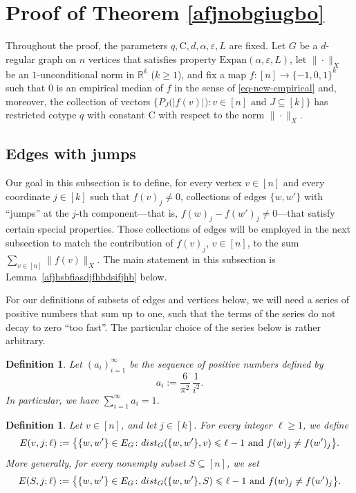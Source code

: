 \documentclass[11pt,leqno]{amsart}
\newtheorem{definition}[theorem]{Definition}
\theoremstyle{remark}
\theoremstyle{plain}
\newcommand{\R}{\mathbb{R}}
\def\dist{{\rm dist}}
\def\dist{{\rm dist}}
\begin{document}
\section{Proof of Theorem \ref*{afjnobgiugbo}} \label{sec4}

Throughout the proof, the parameters $q, \mathrm{C}, d, \alpha,\varepsilon,L$  are fixed.
Let $G$ be a $d$-regular graph on $n$ vertices that satisfies property $\mathrm{Expan}(\alpha,\varepsilon,L)$,
let $\|\cdot\|_X$ be an $1$-unconditional norm in $\R^k$ ($k\geqslant 1$), and fix a map
$f\colon [n]\to\{-1,0,1\}^k$ such that $0$ is an empirical median of $f$ in the sense of \eqref{eq-new-empirical}
and, moreover, the collection of vectors $\big\{P_J\big(|f(v)|\big)\colon v\in[n] \text{ and } J\subseteq[k]\big\}$
has restricted cotype $q$ with constant $\mathrm{C}$ with respect to the norm $\|\cdot\|_X$.

\subsection{Edges with jumps}

Our goal in this subsection is to define, for every vertex $v\in [n]$ and every coordinate $j\in [k]$ such that $f(v)_j\neq 0$,
collections of edges $\{w,w'\}$ with ``jumps'' at the $j$-th component---that is, $f(w)_j-f(w')_j\neq 0$---that
satisfy certain special properties. Those collections of edges will be employed in the next subsection to match
the contribution of $f(v)_j$, $v\in[n]$, to the sum $\sum_{v\in[n]}\|f(v)\|_X$.
The main statement in this subsection is Lemma~\ref{afjhsbfiasdjfhbdsifjhb} below.

For our definitions of subsets of edges and vertices below, we will need a series of positive numbers that sum up to one,
such that the terms of the series do not decay to zero ``too fast''\!. The particular choice of the series below is rather arbitrary.
\begin{definition}
Let $(a_i)_{i=1}^\infty$ be the sequence of positive numbers defined by
$$ a_i:=\frac{6}{\pi^2}\,\frac{1}{i^2}. $$
In particular, we have $\sum_{i=1}^\infty a_i= 1$.
\end{definition}

\begin{definition} \label{akhgfvhgfvdshgfvdjhfgv}
Let $v\in [n]$, and let $j\in [k]$. For every integer $\ell\geqslant 1$, we define
\[ E(v,j;\ell):=\big\{\{w,w'\}\in E_G\colon \dist_G(\{w,w'\},v)\leqslant \ell-1 \text{ and } f(w)_j\neq f(w')_j\big\}. \]
More generally, for every nonempty subset $S\subseteq [n]$, we set
\[ E(S,j;\ell):=\big\{\{w,w'\}\in E_G\colon \dist_G(\{w,w'\},S)\leqslant \ell-1 \text{ and } f(w)_j\neq f(w')_j\big\}. \]
\end{definition}
\end{document}

